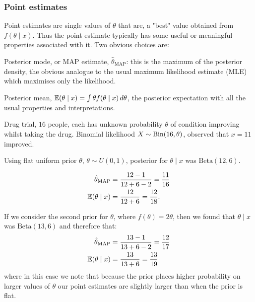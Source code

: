 \documentclass[10pt, a4paper]{article}
\begin{document}
\subsubsection{Point estimates}
Point estimates are single values of $\theta$ that are,
a "best" value obtained from $f(\theta\mid x)$.
Thus the point estimate typically has some useful or meaningful properties associated with it.
Two obvious choices are:

Posterior mode,
or MAP estimate,
$\hat{\theta}_{\text{MAP}}$:
this is the maximum of the posterior density,
the obvious analogue to the usual maximum likelihood estimate
(MLE)
which maximises only the likelihood.

Posterior mean,
$\mathbb{E}(\theta\mid x) = \int\theta f(\theta\mid x)\,d\theta$,
the posterior expectation with all the usual properties and interpretations.

\begin{example}
    Drug trial,
    $16$ people,
    each has unknown probability $\theta$ of condition improving whilst taking the drug.
    Binomial likelihood $X \sim \operatorname{Bin}(16, \theta)$,
    observed that $x = 11$ improved.

    \begin{solution}
        Using flat uniform prior $\theta$,
        $\theta \sim U(0, 1)$,
        posterior for $\theta \mid x$ was $\mathrm{Beta}(12, 6)$.

        \begin{align*}
            \hat{\theta}_{\text{MAP}} &= \frac{12 - 1}{12 + 6 - 2} = \frac{11}{16} \\
            \mathbb{E}(\theta \mid x) &= \frac{12}{12 + 6} = \frac{12}{18}.
        \end{align*}

        If we consider the second prior for $\theta$,
        where $f(\theta) = 2\theta$,
        then we found that $\theta\mid x$ was $\mathrm{Beta}(13, 6)$ and therefore that:
        \begin{align*}
            \hat{\theta}_{\text{MAP}} &= \frac{13 - 1}{13 + 6 - 2} = \frac{12}{17} \\
            \mathbb{E}(\theta \mid x) &= \frac{13}{13 + 6} = \frac{13}{19}
        \end{align*}
        where in this case we note that because the prior places higher probability on larger values of $\theta$ our point estimates are slightly larger than when the prior is flat.
    \end{solution}
\end{example}
\end{document}
